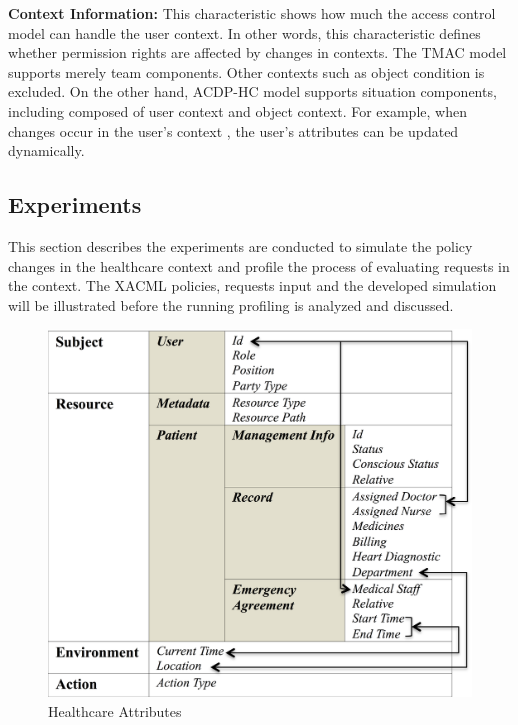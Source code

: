 \textbf{Context Information: }
This characteristic shows how much the access control model can handle the user context. 
In other words, this characteristic defines whether permission rights are affected by changes in contexts. 
The TMAC model supports merely team components. 
Other contexts such as object condition is excluded.
On the other hand, ACDP-HC model supports situation components, including composed of user context and object context. 
For example, when changes occur in the user's context , the user's attributes can be updated dynamically.

\subsection{Experiments}\label{Evaluate:Exp}

This section describes the experiments are conducted to simulate the policy changes in the healthcare context and profile the process of evaluating requests in the context.
The XACML policies, requests input and the developed simulation will be illustrated before the running profiling is analyzed and discussed.

\begin{figure}[ht!]
  \centering
  \includegraphics[scale=0.4]{fig/attributes.png}
  \caption{Healthcare Attributes}
  \label{fig:attributes}
\end{figure}


